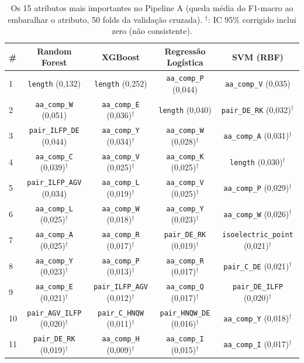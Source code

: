 \begin{table}[htbp]
  \centering
  \caption{Os 15 atributos mais importantes no Pipeline A (queda média do F1-macro ao embaralhar o atributo, 50 folds da validação cruzada). $^\dagger$: IC 95\% corrigido inclui zero (não consistente).}
  \label{tab:top_atributos_a}
  \begin{tabular}{lcccc}
    \toprule
    \# & Random Forest & XGBoost & Regressão Logística & SVM (RBF) \\
    \midrule
    1 & \texttt{length} (0,132) & \texttt{length} (0,252) & \texttt{aa\_comp\_P} (0,044) & \texttt{aa\_comp\_V} (0,035) \\
    2 & \texttt{aa\_comp\_W} (0,051) & \texttt{aa\_comp\_E} (0,036)$^\dagger$ & \texttt{length} (0,040) & \texttt{pair\_DE\_RK} (0,032)$^\dagger$ \\
    3 & \texttt{pair\_ILFP\_DE} (0,044) & \texttt{aa\_comp\_Y} (0,034)$^\dagger$ & \texttt{aa\_comp\_W} (0,028)$^\dagger$ & \texttt{aa\_comp\_A} (0,031)$^\dagger$ \\
    4 & \texttt{aa\_comp\_C} (0,039)$^\dagger$ & \texttt{aa\_comp\_V} (0,025)$^\dagger$ & \texttt{aa\_comp\_K} (0,025)$^\dagger$ & \texttt{length} (0,030)$^\dagger$ \\
    5 & \texttt{pair\_ILFP\_AGV} (0,034) & \texttt{aa\_comp\_L} (0,019)$^\dagger$ & \texttt{aa\_comp\_V} (0,025)$^\dagger$ & \texttt{aa\_comp\_P} (0,029)$^\dagger$ \\
    6 & \texttt{aa\_comp\_L} (0,025)$^\dagger$ & \texttt{aa\_comp\_W} (0,018)$^\dagger$ & \texttt{aa\_comp\_Y} (0,023)$^\dagger$ & \texttt{aa\_comp\_W} (0,026)$^\dagger$ \\
    7 & \texttt{aa\_comp\_A} (0,025)$^\dagger$ & \texttt{aa\_comp\_R} (0,017)$^\dagger$ & \texttt{pair\_DE\_RK} (0,019)$^\dagger$ & \texttt{isoelectric\_point} (0,021)$^\dagger$ \\
    8 & \texttt{aa\_comp\_Y} (0,023)$^\dagger$ & \texttt{aa\_comp\_P} (0,013)$^\dagger$ & \texttt{aa\_comp\_R} (0,017)$^\dagger$ & \texttt{pair\_C\_DE} (0,021)$^\dagger$ \\
    9 & \texttt{aa\_comp\_E} (0,021)$^\dagger$ & \texttt{pair\_ILFP\_AGV} (0,012)$^\dagger$ & \texttt{aa\_comp\_Q} (0,017)$^\dagger$ & \texttt{pair\_DE\_ILFP} (0,020)$^\dagger$ \\
    10 & \texttt{pair\_AGV\_ILFP} (0,020)$^\dagger$ & \texttt{pair\_C\_HNQW} (0,011)$^\dagger$ & \texttt{pair\_HNQW\_DE} (0,016)$^\dagger$ & \texttt{aa\_comp\_Y} (0,018)$^\dagger$ \\
    11 & \texttt{pair\_DE\_RK} (0,019)$^\dagger$ & \texttt{aa\_comp\_H} (0,009)$^\dagger$ & \texttt{aa\_comp\_I} (0,015)$^\dagger$ & \texttt{aa\_comp\_I} (0,017)$^\dagger$ \\

\end{tabular}
\end{table}
